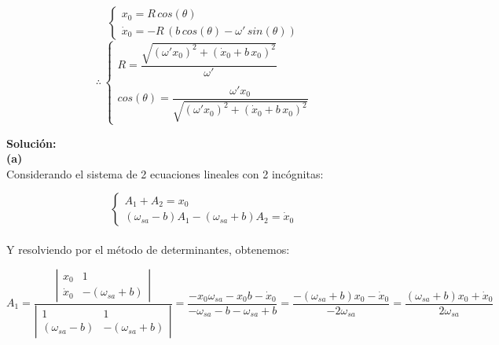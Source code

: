 \documentclass[letter,11pt]{article}
\begin{document}
\begin{enumerate}[a)]
\begin{equation*}
\begin{cases}
                x_0 = R\,cos(\theta) \\
                \dot{x}_0 = -R\,(b\,cos(\theta)-\omega'\,sin(\theta))
            \end{cases}
        \end{equation*}
        \begin{equation*}
            \therefore\,
            \begin{cases}
                R = \dfrac{\sqrt{(\omega'x_0)^2+(\dot{x}_0+b\,x_0)^2}}{\omega'} \\
                \\
                cos(\theta) = \dfrac{\omega'x_0}{\sqrt{(\omega'x_0)^2+(\dot{x}_0+b\,x_0)^2}}
            \end{cases}
        \end{equation*}
\end{enumerate}

\vspace{0.5cm}
\textbf{Solución:} \\

\textbf{(a)} \\

Considerando el sistema de 2 ecuaciones lineales con 2 incógnitas:

\begin{equation*}
    \begin{cases}
        A_1 + A_2 = x_0 \\
        (\omega_{sa} - b) A_1 - (\omega_{sa} + b) A_2 = \dot{x}_0
    \end{cases}
\end{equation*}
\\

Y resolviendo por el método de determinantes, obtenemos:

\begin{equation}
    A_1 = \dfrac{
        \left|
            \begin{smallmatrix}
                x_0 & 1 \\
                \dot{x}_0 & -(\omega_{sa} + b)
            \end{smallmatrix}
        \right|
    }{
        \left|
            \begin{smallmatrix}
                1 & 1 \\
                (\omega_{sa} - b) & -(\omega_{sa} + b)
            \end{smallmatrix}
        \right|
    }
    = \dfrac{-x_0 \omega_{sa} - x_0 b - \dot{x}_0}{-\omega_{sa} - b - \omega_{sa} + b}
    = \dfrac{-(\omega_{sa} + b) x_0 - \dot{x}_0}{-2\omega_{sa}}
    = \dfrac{(\omega_{sa} + b) x_0 + \dot{x}_0}{2\omega_{sa}}
\end{equation}
\end{document}
